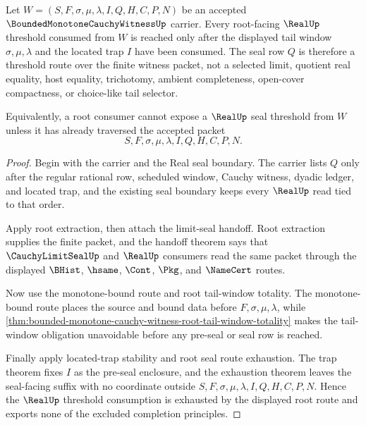 \begin{theorem}
\label{thm:bounded-monotone-cauchy-witness-root-real-seal-threshold-exhaustion}
Let $W=(S,F,\sigma,\mu,\lambda,I,Q,H,C,P,N)$ be an accepted $\BoundedMonotoneCauchyWitnessUp$ carrier. Every root-facing $\RealUp$ threshold consumed from $W$ is reached only after the displayed tail window $\sigma,\mu,\lambda$ and the located trap $I$ have been consumed. The seal row $Q$ is therefore a threshold route over the finite witness packet, not a selected limit, quotient real equality, host equality, trichotomy, ambient completeness, open-cover compactness, or choice-like tail selector.

Equivalently, a root consumer cannot expose a $\RealUp$ seal threshold from $W$ unless it has already traversed the accepted packet
$$
S,F,\sigma,\mu,\lambda,I,Q,H,C,P,N.
$$
\end{theorem}
\begin{proof}
Begin with the carrier and the Real seal boundary. The carrier lists $Q$ only after the regular rational row, scheduled window, Cauchy witness, dyadic ledger, and located trap, and the existing seal boundary keeps every $\RealUp$ read tied to that order.

Apply root extraction, then attach the limit-seal handoff. Root extraction supplies the finite packet, and the handoff theorem says that $\CauchyLimitSealUp$ and $\RealUp$ consumers read the same packet through the displayed $\BHist$, $\hsame$, $\Cont$, $\Pkg$, and $\NameCert$ routes.

Now use the monotone-bound route and root tail-window totality. The monotone-bound route places the source and bound data before $F,\sigma,\mu,\lambda$, while \autoref{thm:bounded-monotone-cauchy-witness-root-tail-window-totality} makes the tail-window obligation unavoidable before any pre-seal or seal row is reached.

Finally apply located-trap stability and root seal route exhaustion. The trap theorem fixes $I$ as the pre-seal enclosure, and the exhaustion theorem leaves the seal-facing suffix with no coordinate outside $S,F,\sigma,\mu,\lambda,I,Q,H,C,P,N$. Hence the $\RealUp$ threshold consumption is exhausted by the displayed root route and exports none of the excluded completion principles.
\end{proof}


